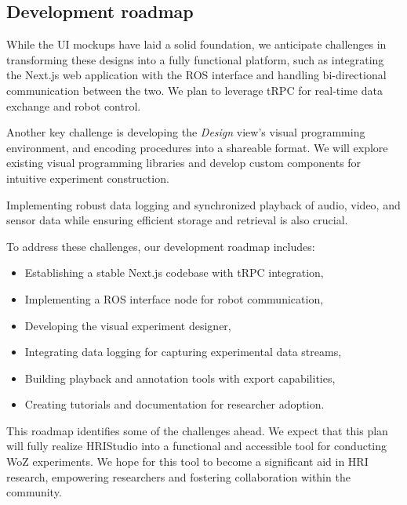 \documentclass[letterpaper, 10 pt, conference]{ieeeconf}
\begin{document}
\subsection{Development roadmap}

While the UI mockups have laid a solid foundation, we anticipate challenges in transforming these designs into a fully functional platform, such as integrating the Next.js web application with the ROS interface and handling bi-directional communication between the two. We plan to leverage tRPC for real-time data exchange and robot control.

Another key challenge is developing the \emph{Design} view's visual programming environment, and encoding procedures into a shareable format. We will explore existing visual programming libraries and develop custom components for intuitive experiment construction.

Implementing robust data logging and synchronized playback of audio, video, and sensor data while ensuring efficient storage and retrieval is also crucial.

To address these challenges, our development roadmap includes:
\begin{itemize}
    \item Establishing a stable Next.js codebase with tRPC integration,
    \item Implementing a ROS interface node for robot communication,
    \item Developing the visual experiment designer,
    \item Integrating data logging for capturing experimental data streams,
    \item Building playback and annotation tools with export capabilities,
    \item Creating tutorials and documentation for researcher adoption.
\end{itemize}

This roadmap identifies some of the challenges ahead. We expect that this plan will fully realize HRIStudio into a functional and accessible tool for conducting WoZ experiments. We hope for this tool to become a significant aid in HRI research, empowering researchers and fostering collaboration within the community. 



\end{document}
